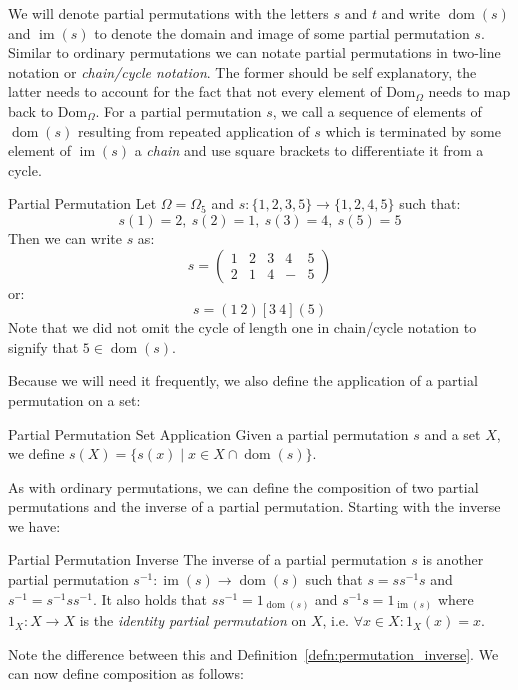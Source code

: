 We will denote partial permutations with the letters $s$ and $t$ and write
$\operatorname{dom}(s)$ and $\operatorname{im}(s)$ to denote the domain and
image of some partial permutation $s$. Similar to ordinary permutations we can
notate partial permutations in two-line notation or \textit{chain/cycle
notation}. The former should be self explanatory, the latter needs to account
for the fact that not every element of
$\mathrm{Dom}_{\Omega}$ needs to map back to $\mathrm{Dom}_{\Omega}$.  For a
partial permutation $s$, we call a sequence of elements of
$\operatorname{dom}(s)$ resulting from repeated application of $s$ which is
terminated by some element of $\operatorname{im}(s)$ a \textit{chain} and use
square brackets to differentiate it from a cycle.
%
\begin{exmp}{Partial Permutation}
  Let $\Omega = \Omega_5$ and $s: \{1,2,3,5\} \rightarrow \{1,2,4,5\}$
  such that:
  \begin{equation*}
    s(1) = 2,\ s(2) = 1,\ s(3) = 4,\ s(5) = 5
  \end{equation*}
  Then we can write $s$ as:
  \begin{equation*}
    s = \begin{pmatrix} 1 & 2 & 3 & 4 & 5 \\ 2 & 1 & 4 & - & 5 \end{pmatrix}
  \end{equation*}
  or:
  \begin{equation*}
    s = (1\ 2)[3\ 4](5)
  \end{equation*}
  Note that we did not omit the cycle of length one in chain/cycle notation to
  signify that $5 \in \operatorname{dom}(s)$.
\end{exmp}
%
Because we will need it frequently, we also define the application of a partial
permutation on a set:

\begin{defn}{Partial Permutation Set Application}
  Given a partial permutation $s$ and a set $X$, we define $s(X) = \{s(x) \mid
  x \in X \cap \operatorname{dom}(s)\}$.
\end{defn}
%
As with ordinary permutations, we can define the composition of two partial
permutations and the inverse of a partial permutation. Starting with the
inverse we have:

\begin{defn}[label=defn:partial_permutation_inverse]{Partial Permutation Inverse}
  The inverse of a partial permutation $s$ is another partial permutation
  $s^{-1}: \operatorname{im}(s) \rightarrow \operatorname{dom}(s)$ such that $s =
  s s^{-1} s$ and $s^{-1} = s^{-1} s s^{-1}$. It also holds that $s s^{-1} =
  1_{\operatorname{dom}(s)}$ and $s^{-1} s = 1_{\operatorname{im}(s)}$ where
  $1_X: X \rightarrow X$ is the \textit{identity partial permutation} on $X$,
  i.e. $\forall x \in X: 1_X(x) = x$.
\end{defn}
%
Note the difference between this and Definition~\ref{defn:permutation_inverse}.
We can now define composition as follows:

